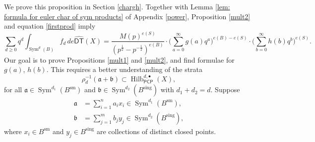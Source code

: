 \documentclass{amsart}
\theoremstyle{definition}
\newcommand{\Sym}{\operatorname{Sym}}
\newcommand{\Hilb}{\operatorname{Hilb}}
\newcommand{\DT}{\mathsf{DT}}
\newcommand{\sm}{\operatorname{sm}}
\newcommand{\sing}{\operatorname{sing}}
\newcommand{\DThat}{\widehat{\DT}}
\newcommand{\PCP}{\mathsf{PCP}}
\begin{document}
We prove this proposition in Section \ref{chargh}. Together with Lemma \ref{lem: formula for euler char of sym products} of Appendix \ref{power}, Proposition \ref{mult2} and equation \eqref{firstprod} imply
\begin{equation} \label{initialprod}
\sum_{d \geq 0} q^d \int_{\Sym^d(B)} f_d \, de 
\DThat (X) = \frac{M(p)^{e(S)}}{(p^{\frac{1}{2}} -
p^{-\frac{1}{2}})^{e(B)}} \cdot \Bigg( \sum_{a=0}^{\infty} g(a) q^a
\Bigg)^{e(B) - e(S)} \cdot \Bigg( \sum_{b=0}^{\infty} h(b) q^b \Bigg)^{e(S)}.
\end{equation}
Our goal is to prove Propositions \ref{mult1} and \ref{mult2}, and
find formulae for $g(a)$, $h(b)$. This requires a better understanding
of the strata
$$
\rho_{d}^{-1} (\mathfrak{a} + \mathfrak{b}) \subset \Hilb^{d, \bullet}_{\PCP }(X),
$$
for all $\mathfrak{a} \in \Sym^{d_1}(B^{\sm})$ and $\mathfrak{b} \in \Sym^{d_2}(B^{\sing})$ with $d_1+d_2=d$. Suppose 
\begin{align*}
\mathfrak{a} &= \sum_{i=1}^{n} a_i x_i \in \Sym^{d_1}(B^{\sm}), \\
\mathfrak{b} &= \sum_{j=1}^{m} b_j y_j \in \Sym^{d_2}(B^{\sing}),
\end{align*}
where $x_i \in B^{\sm}$ and $y_j \in B^{\sing}$ are collections of
distinct closed points. 
\end{document}
